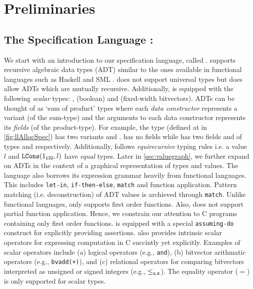\chapter{Preliminaries}
\label{sec:prelims}

\section{The Specification Language : \SpecL{}}
\label{sec:speclang}
We start with an introduction to our specification language, called \SpecL{}.
\SpecL{} supports recursive algebraic data types (ADT) \cite{algebraicdatatypes} similar to the ones available in functional languages such as Haskell \cite{marlow2010haskell} and SML \cite{standardmlspec}.
\SpecL{} does not support universal types but does allow ADTs which are mutually recursive.
Additionally, \SpecL{} is equipped with the following {\em scalar} types: ,  (boolean) and  (fixed-width bitvectors).
ADTs can be thought of as `sum of product' types where each {\em data constructor} represents a variant (of the sum-type)
and the arguments to each data constructor represents its {\em fields} (of the product-type).
For example, the  type (defined at  in \cref{fig:llAllocSpec}) has two variants  and .
 has no fields while  has two fields  and  of types  and  respectively.
Additionally, \SpecL{} follows {\em equirecursive} typing rules i.e.
a  value $l$ and ${\tt LCons}(1_{\tt i32}, l)$ have {\em equal} types.
Later in \cref{sec:valuegraph}, we further expand on ADTs in the context of a graphical representation of types and values.
The language also borrows its expression grammar heavily from functional languages.
This includes {\tt let-in}, {\tt if-then-else}, {\tt match} and function application.
Pattern matching (i.e. deconstruction) of ADT values is archieved through {\tt match}.
Unlike functional languages, \SpecL{} only supports first order functions.
Also, \SpecL{} does not support partial function application.
Hence, we constrain our attention to C programs containing only first order functions.
\SpecL{} is equipped with a special {\tt assuming-do} construct for explicitly providing assertions.
\SpecL{} also provides intrinsic scalar operators for expressing computation in C succintly yet explicitly.
Examples of scalar operators include (a) logical operators (e.g., {\tt and}), (b) bitvector arithmatic operators (e.g., {\tt bvadd(+)}),
and (c) relational operators for comparing bitvectors interpreted as unsigned or signed integers (e.g., {\tt $\leq_{\tt u,s}$}).
The equality operator ($=$) is only supported for scalar types.

